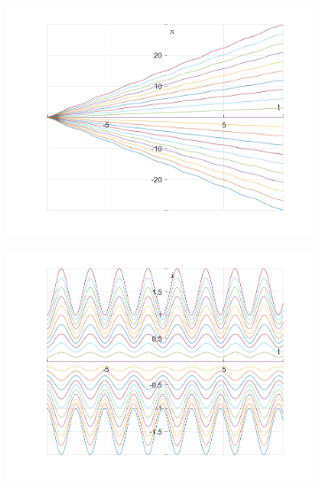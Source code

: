 \documentclass{article}
\begin{document}
	\begin{figure}[h!]
		\centering
		\begin{subfigure}[b]{0.48\linewidth}
			\includegraphics[width=\linewidth]{./SmallOscillations/S3/F3.png}
		\end{subfigure}
		\begin{subfigure}[b]{0.48\linewidth}
			\includegraphics[width=\linewidth]{./SmallOscillations/S3/F4.png}
		\end{subfigure}
	\end{figure}
\end{document}
